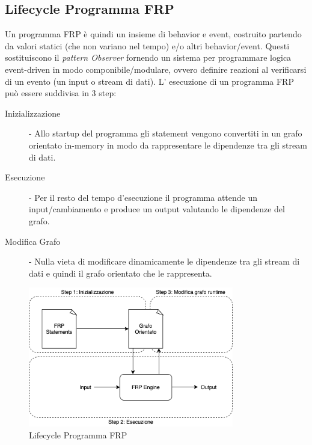 \documentclass[../main.tex]{subfiles}
\begin{document}
\subsection{Lifecycle Programma FRP}
Un programma FRP è quindi un insieme di behavior e event, costruito partendo da valori statici (che non variano nel tempo) e/o altri behavior/event. Questi sostituiscono il \textit{pattern Observer} fornendo un sistema per programmare logica event-driven in modo componibile/modulare, ovvero definire reazioni al verificarsi di un evento (un input o stream di dati). L' esecuzione di un programma FRP può essere suddivisa in 3 step:
\begin{description}
    \item[Inizializzazione] - Allo startup del programma gli statement vengono convertiti in un grafo orientato in-memory in modo da rappresentare le dipendenze tra gli stream di dati.
    \item[Esecuzione] - Per il resto del tempo d'esecuzione il programma attende un input/cambiamento e produce un output valutando le dipendenze del grafo.
    \item[Modifica Grafo] - Nulla vieta di modificare dinamicamente le dipendenze tra gli stream di dati e quindi il grafo orientato che le rappresenta.
\end{description}

\begin{figure}[H]
\centering
\includegraphics[width=0.8\textwidth]{img/frp-scala1.png}
\caption{Lifecycle Programma FRP}
\end{figure}
\end{document}
